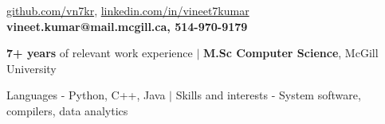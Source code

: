 \documentclass{resume} %
\begin{document}
\begin{hSubsection}
{
    \href{https://github.com/vn7kr}{github.com/vn7kr},
    \href{https://linkedin.com/in/vineet7kumar}{linkedin.com/in/vineet7kumar}
}
{
    \textbf{vineet.kumar@mail.mcgill.ca, 514-970-9179}
}
{%
}
\end{hSubsection}



\smallskip \smallskip 
\begin{rSection}{} \smallskip 
\begin{lSubsection} 
\item \textbf{7+ years} of relevant work experience
        $\vert$ \textbf{M.Sc Computer Science}, McGill University
\item Languages - Python, C++, Java $\vert$ Skills and interests - System software, compilers, data analytics
\end{lSubsection}
\end{rSection}
\end{document}

